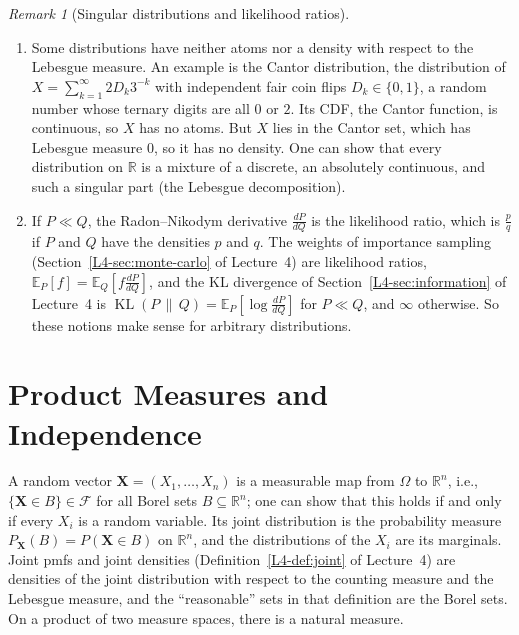 \documentclass[11pt]{article}
\newcommand{\E}{\mathbb{E}}
\DeclareMathOperator{\KL}{KL}
\theoremstyle{definition}
\theoremstyle{plain}
\theoremstyle{remark}
\newtheorem{remark}[definition]{Remark}
\begin{document}
\begin{remark}[Singular distributions and likelihood ratios]\label{rem:singular}
    \begin{enumerate}
        \item Some distributions have neither atoms nor a density with respect to the Lebesgue measure. An example is the Cantor distribution, the distribution of $X = \sum_{k=1}^\infty 2D_k3^{-k}$ with independent fair coin flips $D_k \in \{0, 1\}$, a random number whose ternary digits are all $0$ or $2$. Its CDF, the Cantor function, is continuous, so $X$ has no atoms. But $X$ lies in the Cantor set, which has Lebesgue measure $0$, so it has no density. One can show that every distribution on $\mathbb{R}$ is a mixture of a discrete, an absolutely continuous, and such a singular part (the Lebesgue decomposition).
        \item If $P \ll Q$, the Radon--Nikodym derivative $\frac{dP}{dQ}$ is the likelihood ratio, which is $\frac{p}{q}$ if $P$ and $Q$ have the densities $p$ and $q$. The weights of importance sampling (Section~\ref{L4-sec:monte-carlo} of Lecture~4) are likelihood ratios, $\E_P[f] = \E_Q[f\frac{dP}{dQ}]$, and the KL divergence of Section~\ref{L4-sec:information} of Lecture~4 is $\KL(P \,\|\, Q) = \E_P[\log\frac{dP}{dQ}]$ for $P \ll Q$, and $\infty$ otherwise. So these notions make sense for arbitrary distributions.
    \end{enumerate}
\end{remark}

\section{Product Measures and Independence}\label{sec:product}

A random vector $\mathbf{X} = (X_1, \ldots, X_n)$ is a measurable map from $\Omega$ to $\mathbb{R}^n$, i.e., $\{\mathbf{X} \in B\} \in \mathcal{F}$ for all Borel sets $B \subseteq \mathbb{R}^n$; one can show that this holds if and only if every $X_i$ is a random variable. Its joint distribution is the probability measure $P_{\mathbf{X}}(B) = P(\mathbf{X} \in B)$ on $\mathbb{R}^n$, and the distributions of the $X_i$ are its marginals. Joint pmfs and joint densities (Definition~\ref{L4-def:joint} of Lecture~4) are densities of the joint distribution with respect to the counting measure and the Lebesgue measure, and the ``reasonable'' sets in that definition are the Borel sets. On a product of two measure spaces, there is a natural measure.
\end{document}
